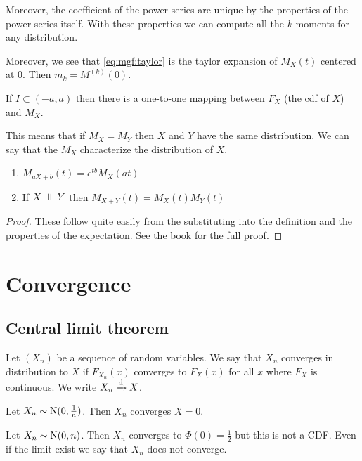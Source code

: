 \documentclass[12pt]{extarticle}
\newcommand{\Normal}{{\operatorfont N}}
\newcommand{\convdist}{\xrightarrow{\operatorfont d}}
\begin{document}
Moreover, the coefficient of the power series are unique by the properties of the power series itself.
With these properties we can compute all the $k$ moments for any distribution.

Moreover, we see that \autoref{eq:mgf:taylor} is the taylor expansion of $M_X(t)$ centered at $0$. Then $m_k = M^{(k)}(0)$.

\begin{proposition}
    If $I \subset (-a, a)$ then there is a one-to-one mapping between $F_X$ (the cdf of $X$) and $M_X$.

    This means that if $M_X = M_Y$ then $X$ and $Y$ have the same distribution.
    We can say that the $M_X$ characterize the distribution of $X$.
\end{proposition}

\begin{proposition}
    \label{prop:mgf:props_of_mgf}
    \skiplineafterproof
    \begin{enumerate}
        \item $M_{aX + b}(t) = e^{tb} M_X (at)$
        \item If $X \perp \!\!\! \perp Y$ then $M_{X+Y}(t) = M_X(t) M_Y(t)$
    \end{enumerate}
\end{proposition}
\begin{proof}
    These follow quite easily from the substituting into the definition and the properties of the expectation.
    See the book for the full proof.
\end{proof}

\section{Convergence}

\subsection{Central limit theorem}

\begin{definition}
    Let $\left(X_n\right)$ be a sequence of random variables.
    We say that $X_n$ converges in distribution to $X$ if $F_{X_n}(x)$ converges to $F_X(x)$ for all $x$ where $F_X$ is continuous.
    We write $X_n \convdist X$.
\end{definition}

\begin{example}
    Let $X_n \sim \Normal(0, \frac{1}{n})$.
    Then $X_n$ converges $X = 0$.
\end{example}
\begin{example}
    Let $X_n \sim \Normal(0, n)$.
    Then $X_n$ converges to $\Phi(0) = \frac{1}{2}$ but this is not a CDF.
    Even if the limit exist we say that $X_n$ does not converge.
\end{example}
\end{document}
